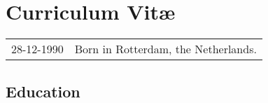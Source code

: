\chapter*{Curriculum Vit\ae}

\makeatletter
\authors{\@firstname\ {\titleshape\@lastname}}
\makeatother

\noindent
\begin{tabular}{p{}l}
    28-12-1990 & Born in Rotterdam, the Netherlands.
\end{tabular}

\section*{Education}


